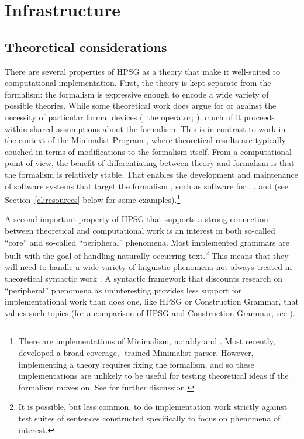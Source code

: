\documentclass[output=paper
 	        ,biblatex
                ,babelshorthands
                ,newtxmath
                ,draftmode
                ,colorlinks, citecolor=brown
]{langscibook}
\begin{document}
\section{Infrastructure}
\label{cl:infrastructure}

\subsection{Theoretical considerations}
\label{cl:theoretical}

There are several properties of HPSG as a theory that make it well-suited to computational implementation.
First, the theory is kept separate from the formalism:
the formalism is expressive enough to encode a wide variety of possible theories.
While some theoretical work does argue for or against the necessity of particular formal devices
(\eg\ the  operator; \citealt{Reape94a}),
much of it proceeds within shared assumptions about the formalism.
This is in contrast to work in the context of the Minimalist Program \citep{Chomsky95a-u},
where theoretical results are typically couched in terms of modifications to the formalism itself.
From a computational point of view, the benefit of differentiating between theory and formalism
is that the formalism is relatively stable.
That enables the development and maintenance of software systems that target the formalism \citep{boguraev1988software},
such as software for , , and 
(see Section~\ref{cl:resources} below for some examples).\footnote{%
	There are implementations of Minimalism, notably \citet{Stabler97a-u} and \citet{Herring:16}.
	Most recently, \citet{Torr2019a-u} developed a broad-coverage, -trained Minimalist parser.
	However, implementing a theory requires fixing the formalism,
	and so these implementations are unlikely to be useful for testing theoretical ideas
	if the formalism moves on.
	See  for further discussion.
}

A second important property of HPSG that supports a strong connection between theoretical and
computational work is an interest in both so-called ``core'' and so-called ``peripheral'' phenomena. Most implemented grammars are built with the goal of handling naturally occurring text.\footnote{It is possible, but less common, to do implementation work strictly against test suites of sentences constructed specifically to focus on phenomena of interest.} This means that they will need to handle a wide variety of linguistic phenomena not always treated in theoretical syntactic work \citep{Baldwin-et-al-05}. A syntactic framework that discounts research on ``peripheral'' phenomena as uninteresting provides less support for implementational work than does one, like HPSG or Construction Grammar\indexcxg, that values such topics (for a comparison of HPSG and Construction Grammar, see ).
\end{document}

